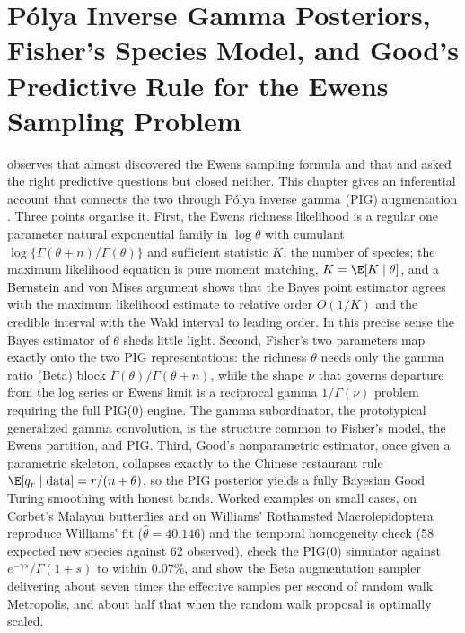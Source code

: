 \chapter{P\'olya Inverse Gamma Posteriors, Fisher's Species Model, and Good's Predictive Rule for the Ewens Sampling Problem}\label{ch:pig}

\begin{chaptersummary}
\citet{pig:mccullagh2016} observes that \citet{pig:fisher1943} almost discovered the Ewens sampling formula and that \citet{pig:good1953} and \citet{pig:goodtoulmin1956} asked the right predictive questions but closed neither. This chapter gives an inferential account that connects the two through P\'olya inverse gamma (PIG) augmentation \citep{pig:he2022}. Three points organise it. First, the Ewens richness likelihood is a regular one parameter natural exponential family in $\log\theta$ with cumulant $\log\{\Gamma(\theta+n)/\Gamma(\theta)\}$ and sufficient statistic $K$, the number of species; the maximum likelihood equation is pure moment matching, $K=\E[K\mid\theta]$, and a Bernstein and von Mises argument shows that the Bayes point estimator agrees with the maximum likelihood estimate to relative order $O(1/K)$ and the credible interval with the Wald interval to leading order. In this precise sense the Bayes estimator of $\theta$ sheds little light. Second, Fisher's two parameters map exactly onto the two PIG representations: the richness $\theta$ needs only the gamma ratio (Beta) block $\Gamma(\theta)/\Gamma(\theta+n)$, while the shape $\nu$ that governs departure from the log series or Ewens limit is a reciprocal gamma $1/\Gamma(\nu)$ problem requiring the full PIG(0) engine. The gamma subordinator, the prototypical generalized gamma convolution, is the structure common to Fisher's model, the Ewens partition, and PIG. Third, Good's nonparametric estimator, once given a parametric skeleton, collapses exactly to the Chinese restaurant rule $\E[q_r\mid\text{data}]=r/(n+\theta)$, so the PIG posterior yields a fully Bayesian Good Turing smoothing with honest bands. Worked examples on small cases, on Corbet's Malayan butterflies and on Williams' Rothamsted Macrolepidoptera reproduce Williams' fit ($\hat\theta=40.146$) and the temporal homogeneity check (58 expected new species against 62 observed), check the PIG(0) simulator against $e^{-\gamma s}/\Gamma(1+s)$ to within $0.07\%$, and show the Beta augmentation sampler delivering about seven times the effective samples per second of random walk Metropolis, and about half that when the random walk proposal is optimally scaled.
\end{chaptersummary}

